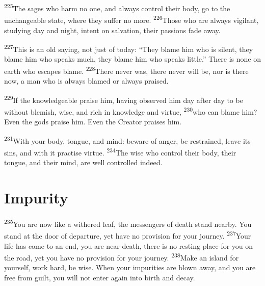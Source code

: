 \documentclass[openany,12pt,english]{book}
\newenvironment{para}{\par\pretolerance=100\tolerance=200\setlength{\emergencystretch}{0.6em}\relax}{\par}
\begin{document}
\begin{para}
    \textsuperscript{225}\thinspace{}The sages who harm no one, and al\-ways con\-trol their bod\-y, go to the un\-change\-a\-ble state, where they suf\-fer no more.
    \textsuperscript{226}\thinspace{}Those who are al\-ways vig\-i\-lant, stud\-y\-ing day and night, in\-tent on sal\-va\-tion, their passions fade a\-way.
\end{para}

\begin{para}
    \textsuperscript{227}\thinspace{}This is an old say\-ing, not just of to\-day: “They blame him who is si\-lent, they blame him who speaks much, they blame him who speaks lit\-tle.” There is none on earth who escapes blame.
    \textsuperscript{228}\thinspace{}There nev\-er was, there nev\-er will be, nor is there now, a man who is al\-ways blamed or al\-ways praised.
\end{para}

\begin{para}
    \textsuperscript{229}\thinspace{}If the knowl\-edge\-a\-ble praise him, hav\-ing ob\-served him day af\-ter day to be with\-out blem\-ish, wise, and rich in knowl\-edge and vir\-tue,
    \textsuperscript{230}\thinspace{}who can blame him? E\-ven the gods praise him. E\-ven the Cre\-a\-tor praises him.
\end{para}

\begin{para}
    \textsuperscript{231}\thinspace{}With your bod\-y, tongue, and mind: be\-ware of an\-ger, be restrained, leave its sins, and with it prac\-tise vir\-tue.
    \textsuperscript{234}\thinspace{}The wise who con\-trol their bod\-y, their tongue, and their mind, are well con\-trolled in\-deed.
\end{para}

\section*{Impurity}
\begin{para}
    \textsuperscript{235}\thinspace{}You are now like a withered leaf, the messengers of death stand near\-by. You stand at the door of de\-par\-ture, yet have no pro\-vi\-sion for your jour\-ney.
    \textsuperscript{237}\thinspace{}Your life has come to an end, you are near death, there is no rest\-ing place for you on the road, yet you have no pro\-vi\-sion for your jour\-ney.
    \textsuperscript{238}\thinspace{}Make an is\-land for your\-self, work hard, be wise. When your impurities are blown a\-way, and you are free from guilt, you will not en\-ter again in\-to birth and de\-cay.
\end{para}
\end{document}
